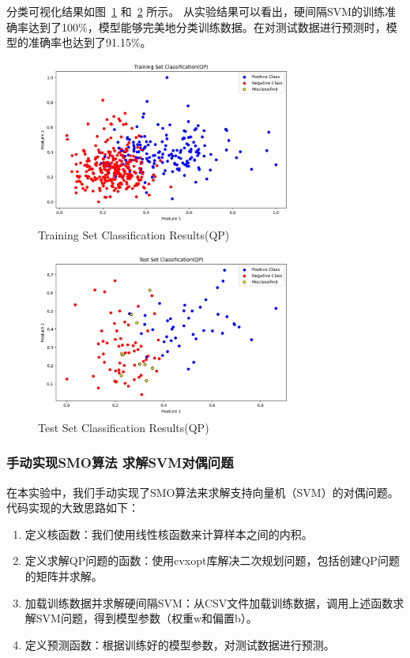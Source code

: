 \documentclass[12pt]{article}
\begin{document}
分类可视化结果如图~\ref{QP_train} 和~\ref{QP_test} 所示。
从实验结果可以看出，硬间隔SVM的训练准确率达到了100\%，模型能够完美地分类训练数据。在对测试数据进行预测时，模型的准确率也达到了91.15\%。
\begin{figure}[htbp]
  \centering
  \includegraphics[width=0.75\textwidth]{figures/QP_train.png}
  \caption{Training Set Classification Results(QP)}
  \label{QP_train}
\end{figure}

\begin{figure}[htbp]
  \centering
  \includegraphics[width=0.75\textwidth]{figures/QP_test.png}
  \caption{Test Set Classification Results(QP)}
  \label{QP_test}
\end{figure}


\subsubsection{手动实现SMO算法 求解SVM对偶问题}

在本实验中，我们手动实现了SMO算法来求解支持向量机（SVM）的对偶问题。代码实现的大致思路如下：
\begin{enumerate}
  \item 定义核函数：我们使用线性核函数来计算样本之间的内积。
  \item 定义求解QP问题的函数：使用cvxopt库解决二次规划问题，包括创建QP问题的矩阵并求解。
  \item 加载训练数据并求解硬间隔SVM：从CSV文件加载训练数据，调用上述函数求解SVM问题，得到模型参数（权重w和偏置b）。
  \item 定义预测函数：根据训练好的模型参数，对测试数据进行预测。
\end{enumerate}
\end{document}
